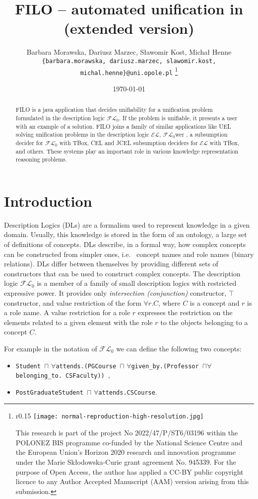 \documentclass{article}
\date{\today}
\author{Barbara Morawska, Dariusz Marzec, Sławomir Kost, Michał Henne\\
	\texttt{\small\{barbara.morawska,  dariusz.marzec, slawomir.kost, michal.henne\}@uni.opole.pl}
	\thanks{\small	%
			\begin{wrapfigure}[4]{r}{0.15\textwidth}
				\vspace{-5mm}
				\hspace{-3mm}
				\texttt{[image: normal-reproduction-high-resolution.jpg]}
			\end{wrapfigure}
			This research is part of the project No 2022/47/P/ST6/03196 within the POLONEZ BIS
			programme co-funded by the National Science Centre and the European Union’s Horizon 2020
			research and innovation programme under the Marie Skłodowska-Curie grant agreement
			No. 945339. For the purpose of Open Access, the author has applied a CC-BY public copyright
			licence to any Author Accepted Manuscript (AAM) version arising from this submission.		
			}}
\title{FILO -- automated unification in \flo\\
 (extended version)}
\newcommand{\el}{\ensuremath{\mathcal{EL}}\xspace}
\newcommand{\flo}{\ensuremath{\mathcal{FL}_0}\xspace}
\newcommand{\ie}{i.e.\ }
\begin{document}
	\maketitle
	\begin{abstract}
	FILO is a java application that decides unifiability for a unification problem formulated in 
	the description logic \flo. If the problem is unifiable, it presents a user with
	an example of a solution. FILO joins a family of similar applications like UEL\cite{Baader2012} solving unification problems in
	the description logic \el, \flo{wer} \cite{Baader2022}, a subsumption decider for \flo with TBox, CEL \cite{Baader2006} and JCEL \cite{Mendez2012} subsumption deciders
	for \el with TBox, and others. These systems play an important role in various knowledge representation reasoning problems.
	
\end{abstract}
	
	\section{Introduction}
	Description Logics (DLs) are a formalism used to represent knowledge in a given domain.
	Usually, this knowledge is stored in the form of an ontology, a large set of definitions of concepts.
	DLs describe, in a formal way, how complex concepts can be constructed from simpler ones, \ie
	concept names and role names (binary relations). DLs differ between themselves by providing different sets of constructors that can be used to construct complex concepts.
	The description logic \flo is a member of a family of small description logics with restricted expressive power. It provides only \emph{intersection (conjunction)} constructor, $\top$ constructor, and value restriction of the form
	$\forall r.C$, where $C$ is a concept and $r$ is a role name. A value restriction for a role $r$ expresses the restriction on the elements related to a given element with the role $r$ to the objects belonging to a concept $C$.
		
	For example in the notation of \flo we can define the following two concepts:
	
	\begin{itemize}
		\item  \texttt{Student $\sqcap\,\, \forall$attends.(PGCourse $\sqcap\,\, \forall$given\_by.(Professor $\sqcap \forall$belonging\_to. CSFaculty)) },
		\item  \texttt{PostGraduateStudent $\sqcap\,\, \forall$attends.CSCourse}.
	\end{itemize}
	
\end{document}
